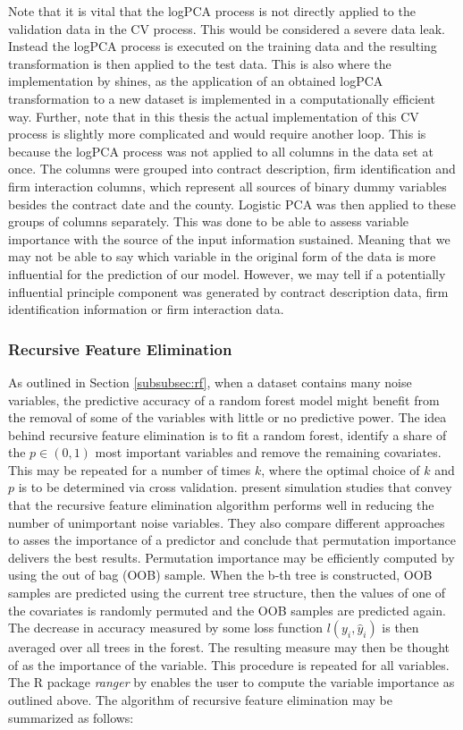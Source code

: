 \documentclass[a4paper,12pt, headsepline]{scrartcl}
\numberwithin{equation}{section}
\begin{document}
Note that it is vital that the logPCA process is not directly applied to the validation data in the CV process. This would be considered a severe data leak. Instead the logPCA process is executed on the training data and the resulting transformation is then applied to the test data. This is also where the implementation by \citet{logPCA} shines, as the application of an obtained logPCA transformation to a new dataset is implemented in a computationally efficient way. Further, note that in this thesis the actual implementation of this CV process is slightly more complicated and would require another loop. This is because the logPCA process was not applied to all columns in the data set at once. The columns were grouped into contract description, firm identification and firm interaction columns, which represent all sources of binary dummy variables besides the contract date and the county. Logistic PCA was then applied to these groups of columns separately. This was done to be able to assess variable importance with the source of the input information sustained. Meaning that we may not be able to say which variable in the original form of the data is more influential for the prediction of our model. However, we may tell if a potentially influential principle component was generated by contract description data, firm identification information or firm interaction data.

\subsubsection{Recursive Feature Elimination}\label{subsubsec:rfe}
As outlined in Section \ref{subsubsec:rf}, when a dataset contains many noise variables, the predictive accuracy of a random forest model might benefit from the removal of some of the variables with little or no predictive power. The idea behind recursive feature elimination is to fit a random forest, identify a share of the $p \in (0, 1)$ most important variables and remove the remaining covariates. This may be repeated for a number of times $k$, where the optimal choice of $k$ and $p$ is to be determined via cross validation. \citet{gregorutti13} present simulation studies that convey that the recursive feature elimination algorithm performs well in reducing the number of unimportant noise variables. They also compare different approaches to asses the importance of a predictor and conclude that permutation importance delivers the best results. Permutation importance may be efficiently computed by using the out of bag  (OOB) sample. When the b-th tree is constructed, OOB samples are predicted using the current tree structure, then the values of one of the covariates is randomly permuted and the OOB samples are predicted again. The decrease in accuracy measured by some loss function $l(y_i, \hat y_i)$ is then averaged over all trees in the forest. The resulting measure may then be thought of as the importance of the variable. This procedure is repeated for all variables. The R package \textit{ranger} by \citet{ranger} enables the user to compute the variable importance as outlined above. The algorithm of recursive feature elimination may be summarized as follows:
\end{document}
